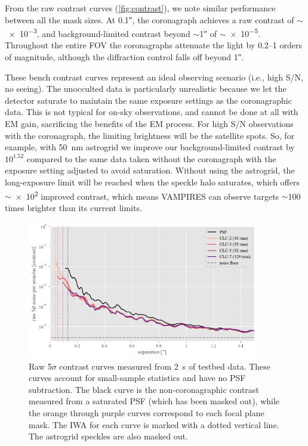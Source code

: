 \documentclass[]{spie}  %
\begin{document}
From the raw contrast curves (\autoref{fig:contrast}), we note similar performance between all the mask sizes. At \ang{;;0.1}, the coronagraph achieves a raw contrast of $\sim$ \num{e-3}, and background-limited contrast beyond $\sim$\ang{;;1} of $\sim$\num{e-5}. Throughout the entire FOV the coronagraphs attenuate the light by \numrange{0.2}{1} orders of magnitude, although the diffraction control falls off beyond \ang{;;1}.

These bench contrast curves represent an ideal observing scenario (i.e., high S/N, no seeing). The unocculted data is particularly unrealistic because we let the detector saturate to maintain the same exposure settings as the coronagraphic data. This is not typical for on-sky observations, and cannot be done at all with EM gain, sacrificing the benefits of the EM process. For high S/N observations with the coronagraph, the limiting brightness will be the satellite spots. So, for example, with \qty{50}{\nano\meter} astrogrid we improve our background-limited contrast by $10^{1.52}$ compared to the same data taken without the coronagraph with the exposure setting adjusted to avoid saturation. Without using the astrogrid, the long-exposure limit will be reached when the speckle halo saturates, which offers $\sim$\num{e2} improved contrast, which means VAMPIRES can observe targets $\sim$100 times brighter than its current limits.

\begin{figure}
   \centering
   \includegraphics[width=0.9\textwidth]{figures/saturated_bench_20220628_curves}
   \caption{Raw 5$\sigma$ contrast curves measured from \qty{2}{\second} of testbed data. These curves account for small-sample statistics and have no PSF subtraction. The black curve is the non-coronagraphic contrast measured from a saturated PSF (which has been masked out), while the orange through purple curves correspond to each focal plane mask. The IWA for each curve is marked with a dotted vertical line. The astrogrid speckles are also masked out.}\label{fig:contrast}
\end{figure}
\end{document}
